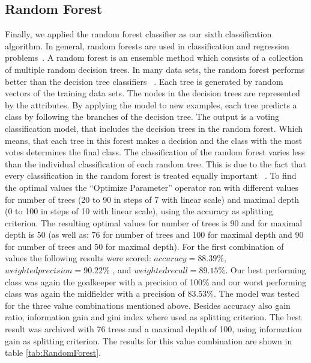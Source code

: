 \subsection{Random Forest}
Finally, we applied the random forest classifier as our sixth classification algorithm. In
general, random forests are used in classification and regression problems~\cite{ref_rapidminerRandomForest}.
A random forest is an ensemble method which consists of a collection of
multiple random decision trees. In many data sets, the random forest performs better than the decision tree classifiers ~\cite{ref_Tan}. Each tree is generated by random vectors of the training data sets. The nodes in the decision
trees are represented by the attributes. \newline 
By applying the model to new examples, each tree predicts a class by following the branches of the decision tree. The output is a voting classification model, that includes the decision trees in the random forest. Which means, that each tree in this forest makes a decision and the class with the most votes determines the final class. The classification of the random forest varies less than the individual classification of each random tree. This is due to the fact that every classification in the random forest is treated equally important ~\cite{ref_rapidminerRandomForest}. \newline
To find the optimal values the ``Optimize Parameter'' operator ran with different values for number of trees (20 to 90 in steps of 7 with linear scale) and maximal depth (0 to 100 in steps of 10 with linear scale), using the accuracy as splitting criterion. The resulting
optimal values for number of trees is 90 and for maximal depth is 50 (as well as: 76 for number of trees and 100 for maximal depth and 90 for number of trees and 50 for maximal depth). 
For the first combination of values the following results were scored: $accuracy = 88.39\%$, $weighted precision = 90.22\%$ , and $weighted recall = 89.15\%$. Our best performing class was again the goalkeeper with a precision of 100\% and our worst performing class was again the midfielder with a precision of 83.53\%. The model was tested for the three
value combinations mentioned above. 
Besides accuracy also gain ratio, information gain and gini index where used as splitting criterion. 
The best result was archived with 76 trees and a maximal depth of 100, using information gain as splitting criterion. 
The results for this value combination are shown in table \ref{tab:RandomForest}.
